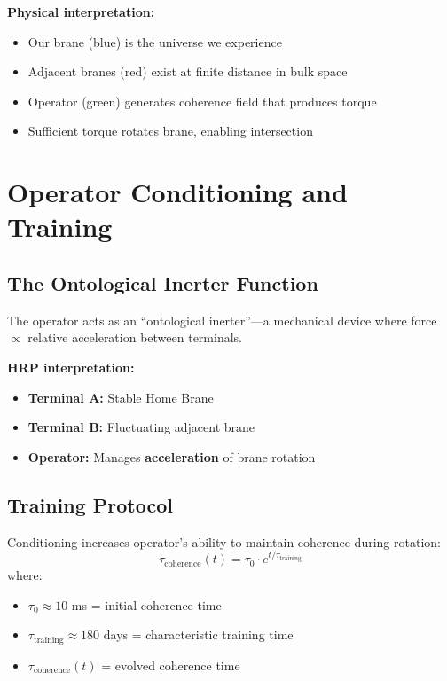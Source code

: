 \textbf{Physical interpretation:}
\begin{itemize}
\item Our brane (blue) is the universe we experience
\item Adjacent branes (red) exist at finite distance in bulk space
\item Operator (green) generates coherence field that produces torque
\item Sufficient torque rotates brane, enabling intersection
\end{itemize}

\section{Operator Conditioning and Training}

\subsection{The Ontological Inerter Function}

The operator acts as an ``ontological inerter''---a mechanical device where force $\propto$ relative acceleration between terminals.

\textbf{HRP interpretation:}
\begin{itemize}
\item \textbf{Terminal A:} Stable Home Brane
\item \textbf{Terminal B:} Fluctuating adjacent brane
\item \textbf{Operator:} Manages \textbf{acceleration} of brane rotation
\end{itemize}

\subsection{Training Protocol}

Conditioning increases operator's ability to maintain coherence during rotation:
\begin{equation}
\tau_{\text{coherence}}(t) = \tau_0 \cdot e^{t/\tau_{\text{training}}}
\end{equation}
where:
\begin{itemize}
\item $\tau_0 \approx 10$ ms = initial coherence time
\item $\tau_{\text{training}} \approx 180$ days = characteristic training time
\item $\tau_{\text{coherence}}(t)$ = evolved coherence time
\end{itemize}

